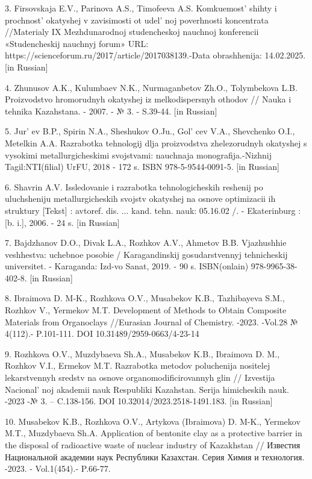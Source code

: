 3. Firsovskaja E.V., Parinova A.S., Timofeeva A.S.
Komkuemost'{} shihty i prochnost'{}
okatyshej v zavisimosti ot udel' noj poverhnosti
koncentrata //Materialy IX Mezhdunarodnoj studencheskoj nauchnoj
konferencii «Studencheskij nauchnyj forum» URL:
https://scienceforum.ru/2017/article/2017038139.-Data obrashhenija:
14.02.2025. {[}in Russian{]}

4. Zhunusov A.K., Kulumbaev N.K., Nurmaganbetov Zh.O., Tolymbekova L.B.
Proizvodstvo hromorudnyh okatyshej iz melkodispersnyh othodov // Nauka i
tehnika Kazahstana. - 2007. - № 3. - S.39-44. {[}in Russian{]}

5. Jur' ev B.P., Spirin N.A., Sheshukov O.Ju.,
Gol' cev V.A., Shevchenko O.I., Metelkin A.A. Razrabotka
tehnologij dlja proizvodstva zhelezorudnyh okatyshej s vysokimi
metallurgicheskimi svojstvami: nauchnaja monografija.-Nizhnij
Tagil:NTI(filial) UrFU, 2018 - 172 s. ISBN 978-5-9544-0091-5. {[}in
Russian{]}

6. Shavrin A.V. Issledovanie i razrabotka tehnologicheskih reshenij po
uluchsheniju metallurgicheskih svojstv okatyshej na osnove optimizacii
ih struktury {[}Tekst{]} : avtoref. dis. ... kand. tehn. nauk: 05.16.02
/. - Ekaterinburg : {[}b. i.{]}, 2006. - 24 s. {[}in Russian{]}

7. Bajdzhanov D.O., Divak L.A., Rozhkov A.V., Ahmetov B.B. Vjazhushhie
veshhestva: uchebnoe posobie / Karagandinskij gosudarstvennyj
tehnicheskij universitet. - Karaganda: Izd-vo Sanat, 2019. - 90 s.
ISBN(onlain) 978-9965-38-402-8. {[}in Russian{]}

8. Ibraimova D. M-K., Rozhkova O.V., Musabekov K.B., Tazhibayeva S.M.,
Rozhkov V., Yermekov M.T. Development of Methods to Obtain Composite
Materials from Organoclays //Eurasian Journal of Chemistry. -2023.
-Vol.28 № 4(112).- P.101-111. DOI 10.31489/2959-0663/4-23-14

9. Rozhkova O.V., Muzdybaeva Sh.A., Musabekov K.B., Ibraimova D. M.,
Rozhkov V.I., Ermekov M.T. Razrabotka metodov poluchenija nositelej
lekarstvennyh sredstv na osnove organomodificirovannyh glin // Izvestija
Nacional' noj akademii nauk Respubliki Kazahstan. Serija
himicheskih nauk. -2023 -№ 3. -- C.138-156. DOI
10.32014/2023.2518-1491.183. {[}in Russian{]}

10. Musabekov K.B., Rozhkova O.V., Artykova (Ibraimova) D. M-K., Yermekov
M.T., Muzdybaeva Sh.A. Application of bentonite clay as a protective
barrier in the disposal of radioactive waste of nuclear industry of
Kazakhstan // Известия Национальной академии наук Республики Казахстан.
Серия Химия и технология. -2023. - Vol.1(454).- P.66-77.
\href{https://doi.org/10.32014/2023.2518-1491.148}{}

